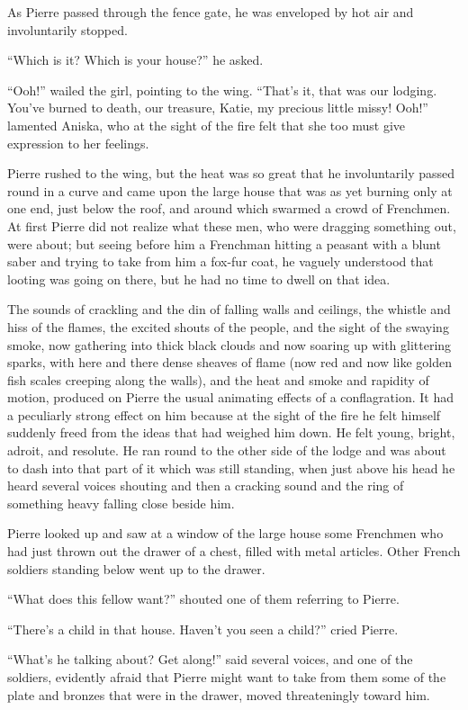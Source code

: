 As Pierre passed through the fence gate, he was enveloped by hot
air and involuntarily stopped.

``Which is it? Which is your house?'' he asked.

``Ooh!'' wailed the girl, pointing to the wing. ``That's it, that
was our lodging. You've burned to death, our treasure, Katie, my
precious little missy! Ooh!'' lamented Aniska, who at the sight
of the fire felt that she too must give expression to her
feelings.

Pierre rushed to the wing, but the heat was so great that he
involuntarily passed round in a curve and came upon the large
house that was as yet burning only at one end, just below the
roof, and around which swarmed a crowd of Frenchmen. At first
Pierre did not realize what these men, who were dragging
something out, were about; but seeing before him a Frenchman
hitting a peasant with a blunt saber and trying to take from him
a fox-fur coat, he vaguely understood that looting was going on
there, but he had no time to dwell on that idea.

The sounds of crackling and the din of falling walls and
ceilings, the whistle and hiss of the flames, the excited shouts
of the people, and the sight of the swaying smoke, now gathering
into thick black clouds and now soaring up with glittering
sparks, with here and there dense sheaves of flame (now red and
now like golden fish scales creeping along the walls), and the
heat and smoke and rapidity of motion, produced on Pierre the
usual animating effects of a conflagration. It had a peculiarly
strong effect on him because at the sight of the fire he felt
himself suddenly freed from the ideas that had weighed him
down. He felt young, bright, adroit, and resolute. He ran round
to the other side of the lodge and was about to dash into that
part of it which was still standing, when just above his head he
heard several voices shouting and then a cracking sound and the
ring of something heavy falling close beside him.

Pierre looked up and saw at a window of the large house some
Frenchmen who had just thrown out the drawer of a chest, filled
with metal articles. Other French soldiers standing below went up
to the drawer.

``What does this fellow want?'' shouted one of them referring to
Pierre.

``There's a child in that house. Haven't you seen a child?''
cried Pierre.

``What's he talking about? Get along!'' said several voices, and
one of the soldiers, evidently afraid that Pierre might want to
take from them some of the plate and bronzes that were in the
drawer, moved threateningly toward him.

